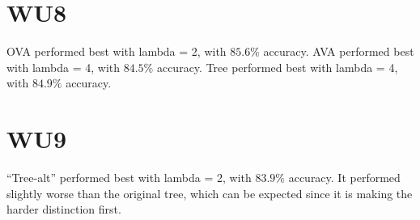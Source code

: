 \section{WU8}
    OVA performed best with lambda = 2, with $85.6\%$ accuracy.
    AVA performed best with lambda = 4, with $84.5\%$ accuracy.
    Tree performed best with lambda = 4, with $84.9\%$ accuracy.

\section{WU9}
    ``Tree-alt'' performed best with lambda = 2, with $83.9\%$ accuracy. It performed slightly worse than the original tree, which can be expected since it is making the harder distinction first.
